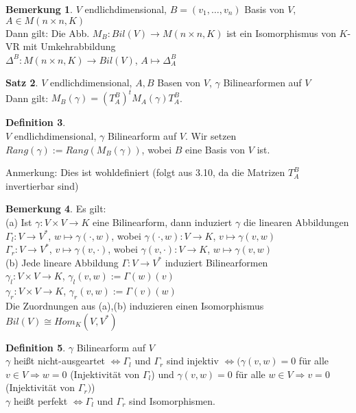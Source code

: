 \documentclass[10pt,a4paper,numbers=endperiod]{scrartcl}
\theoremstyle{definition}
\newtheorem{satz}{Satz}[section]
\newtheorem{defi}[satz]{Definition}
\newtheorem{bem}[satz]{Bemerkung}
\begin{document}
\begin{bem}
	$V$ endlichdimensional, $B = (v_1, \ldots, v_n)$ Basis von $V$, $A \in M(n \times n, K)$\\
	Dann gilt: Die Abb. $M_B : Bil (V) \rightarrow M(n \times n, K)$ ist ein Isomorphismus von $K$-VR mit Umkehrabbildung\\ $\varDelta^B: M(n\times n, K) \rightarrow Bil(V)$, $A \mapsto \varDelta_A^B$
\end{bem}

\begin{satz}
	$V$ endlichdimensional, $A, B$ Basen von $V$, $\gamma$ Bilinearformen auf $V$\\
	Dann gilt: $M_B(\gamma) = (T_A^B)^t M_A(\gamma) T_A^B$. 
\end{satz}

\begin{defi}
	$ $\\
	$V$ endlichdimensional, $\gamma$ Bilinearform auf $V$. Wir setzen $Rang(\gamma) := Rang (M_B(\gamma))$, wobei $B$ eine Basis von $V$ ist. 
\end{defi}

Anmerkung: Dies ist wohldefiniert (folgt aus 3.10, da die Matrizen $T_A^B$ invertierbar sind)

\begin{bem}
	Es gilt:\\
	(a) Ist $\gamma: V \times V \rightarrow K$ eine Bilinearform, dann induziert $\gamma$ die linearen Abbildungen\\
	$\varGamma_l : V \rightarrow V^*$, $w \mapsto \gamma(\cdot, w)$, wobei $\gamma(\cdot, w): V \rightarrow K$, $v \mapsto \gamma(v,w)$\\
	$\varGamma_r : V \rightarrow V^*$, $v \mapsto \gamma(v, \cdot)$, wobei $\gamma(v, \cdot) : V \rightarrow K$, $w \mapsto \gamma(v,w)$\\
	(b) Jede lineare Abbildung $\varGamma : V \rightarrow V^*$ induziert Bilinearformen\\
	$\gamma_l: V \times V \rightarrow K$, $\gamma_l (v,w) := \varGamma(w) (v)$\\
	$\gamma_r: V \times V \rightarrow K$, $\gamma_r (v,w) := \varGamma(v)(w)$\\
	Die Zuordnungen aus (a),(b) induzieren einen Isomorphismus $Bil(V) \cong Hom_K(V, V^*)$ 
\end{bem}

\begin{defi}
	$\gamma$ Bilinearform auf $V$\\
	$\gamma$ heißt nicht-ausgeartet $\Leftrightarrow \varGamma_l$ und $\varGamma_r$ sind injektiv $\Leftrightarrow (\gamma(v,w) = 0$ für alle $v \in V \Rightarrow w = 0$ (Injektivität von $\varGamma_l$) und $\gamma (v, w) = 0$ für alle $w \in V \Rightarrow v = 0$ (Injektivität von $\varGamma_r)$)\\
	$\gamma$ heißt perfekt $\Leftrightarrow \varGamma_l$ und $\varGamma_r$ sind Isomorphismen.
\end{defi}
\end{document}

